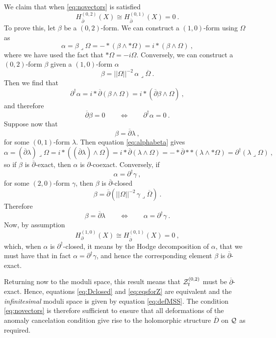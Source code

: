 \documentclass[12pt,a4paper]{article}
\def\bar#1{\overline{#1}}
\let\p=\partial
\def\bp{\bar{\partial}}
\theoremstyle{definition}
\begin{document}
We claim that when \eqref{eq:novectors} is satisfied
\[ H_{\bp}^{(0,2)}(X) \cong H_{\bp}^{(0,1)}(X) = 0~.\]
To prove this, let $\beta$ be a $(0,2)$-form.  We can construct a $(1,0)$-form using $\Omega$ as
\begin{equation} 
\alpha = \beta\lrcorner\Omega = - *(\beta\wedge *\Omega) = i *(\beta\wedge \Omega)~,\label{eq:alphabeta}
\end{equation}
where we have used the fact that $*\Omega = -i \Omega$.  Conversely, we can construct a $(0,2)$-form $\beta$ given a $(1,0)$-form $\alpha$
\[ \beta = ||\Omega||^{-2}\, \alpha\lrcorner\bar\Omega~.\]
Then we find that
\[\p^\dagger\alpha =  i * \bp (\beta\wedge \Omega) = i *(\bp\beta\wedge\Omega)~,\]
and therefore
\[ \bp\beta = 0\qquad\iff\qquad\p^\dagger\alpha = 0~.\] 
Suppose now that 
\[\beta = \bp\lambda~,\]
 for some $(0,1)$-form $\lambda$.  Then equation \eqref{eq:alphabeta} gives 
 \begin{equation*}
 \alpha = (\bp\lambda)\lrcorner\Omega = i *((\bp\lambda)\wedge\Omega) = i * \bp(\lambda\wedge\Omega)
 =  - *\bp **(\lambda\wedge *\Omega) = \p^\dagger (\lambda\lrcorner\Omega)~,
 \end{equation*}
so if $\beta$ is $\bp$-exact, then $\alpha$ is $\p$-coexact.  Conversely, if 
\[ \alpha = \p^\dagger\gamma~,\]
for some $(2,0)$-form $\gamma$, then $\beta$ is $\bp$-closed
\[ \beta = \bp(||\Omega||^{-2}\, \gamma\lrcorner\bar\Omega)~.\]
Therefore
\[\beta = \bp\lambda \qquad\iff\qquad \alpha = \p^\dagger\gamma ~.\] 
Now, by assumption 
\[ H_{\p}^{(1,0)}(X) \cong H_{\bp}^{(0,1)}(X) = 0~,\]
which, when $\alpha$ is $\p^\dagger$-closed, it means by the Hodge decomposition of $\alpha$, that we must have that
in fact $\alpha = \p^\dagger\gamma$, and hence the corresponding element $\beta$ is $\bp$-exact.

 
Returning now to the moduli space, this result means that ${\cal Z}_t^{(0,2)}$ must be $\bp$-exact.
Hence, equations \eqref{eq:Dclosed} and \eqref{eq:eqsforZ} are equivalent and the {\it infinitesimal} moduli space is given by
equation \eqref{eq:defMSS}.  The condition \eqref{eq:novectors} is therefore sufficient to ensure that all deformations of the anomaly cancelation condition give rise to the holomorphic structure $\bar D$ on $\cal Q$ as required. 
\end{document}
